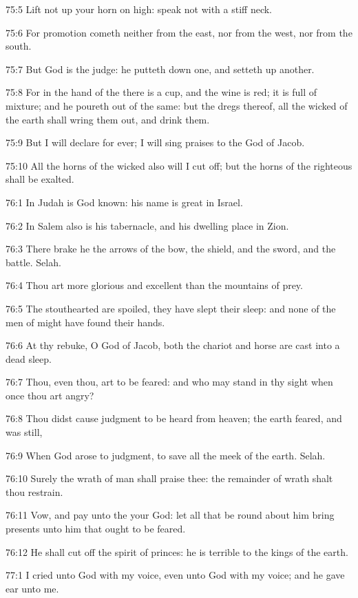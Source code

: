 75:5 Lift not up your horn on high: speak not with a stiff neck.

75:6 For promotion cometh neither from the east, nor from the west,
nor from the south.

75:7 But God is the judge: he putteth down one, and setteth up
another.

75:8 For in the hand of the \LORD there is a cup, and the wine is red;
it is full of mixture; and he poureth out of the same: but the dregs
thereof, all the wicked of the earth shall wring them out, and drink
them.

75:9 But I will declare for ever; I will sing praises to the God of
Jacob.

75:10 All the horns of the wicked also will I cut off; but the horns
of the righteous shall be exalted.



76:1 In Judah is God known: his name is great in Israel.

76:2 In Salem also is his tabernacle, and his dwelling place in Zion.

76:3 There brake he the arrows of the bow, the shield, and the sword,
and the battle. Selah.

76:4 Thou art more glorious and excellent than the mountains of prey.

76:5 The stouthearted are spoiled, they have slept their sleep: and
none of the men of might have found their hands.

76:6 At thy rebuke, O God of Jacob, both the chariot and horse are
cast into a dead sleep.

76:7 Thou, even thou, art to be feared: and who may stand in thy sight
when once thou art angry?

76:8 Thou didst cause judgment to be heard from heaven; the earth
feared, and was still,

76:9 When God arose to judgment, to save all the meek of the earth.
Selah.

76:10 Surely the wrath of man shall praise thee: the remainder of
wrath shalt thou restrain.

76:11 Vow, and pay unto the \LORD your God: let all that be round about
him bring presents unto him that ought to be feared.

76:12 He shall cut off the spirit of princes: he is terrible to the
kings of the earth.



77:1 I cried unto God with my voice, even unto God with my voice; and
he gave ear unto me.

